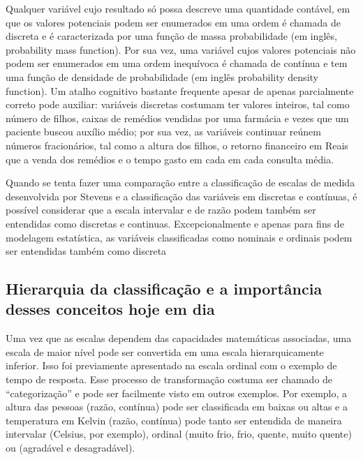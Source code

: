 \documentclass[
]{book}
\begin{document}
Qualquer variável cujo resultado só possa descreve uma quantidade contável, em que os valores potenciais podem ser enumerados em uma ordem é chamada de discreta e é caracterizada por uma função de massa probabilidade (em inglês, probability mass function). Por sua vez, uma variável cujos valores potenciais não podem ser enumerados em uma ordem inequívoca é chamada de contínua e tem uma função de densidade de probabilidade (em inglês probability density function). Um atalho cognitivo bastante frequente apesar de apenas parcialmente correto pode auxiliar: variáveis discretas costumam ter valores inteiros, tal como número de filhos, caixas de remédios vendidas por uma farmácia e vezes que um paciente buscou auxílio médio; por sua vez, as variáveis continuar reúnem números fracionários, tal como a altura dos filhos, o retorno financeiro em Reais que a venda dos remédios e o tempo gasto em cada em cada consulta média.

Quando se tenta fazer uma comparação entre a classificação de escalas de medida desenvolvida por Stevens e a classificação das variáveis em discretas e contínuas, é possível considerar que a escala intervalar e de razão podem também ser entendidas como discretas e continuas. Excepcionalmente e apenas para fins de modelagem estatística, as variáveis classificadas como nominais e ordinais podem ser entendidas também como discreta \citep[p.20]{Borgatta1980, privitera2016}

\hypertarget{hierarquia-da-classificauxe7uxe3o-e-a-importuxe2ncia-desses-conceitos-hoje-em-dia}{%
\subsection{Hierarquia da classificação e a importância desses conceitos hoje em dia}\label{hierarquia-da-classificauxe7uxe3o-e-a-importuxe2ncia-desses-conceitos-hoje-em-dia}}

Uma vez que as escalas dependem das capacidades matemáticas associadas, uma escala de maior nível pode ser convertida em uma escala hierarquicamente inferior. Isso foi previamente apresentado na escala ordinal com o exemplo de tempo de resposta. Esse processo de transformação costuma ser chamado de ``categorização'' e pode ser facilmente visto em outros exemplos. Por exemplo, a altura das pessoas (razão, contínua) pode ser classificada em baixas ou altas e a temperatura em Kelvin (razão, contínua) pode tanto ser entendida de maneira intervalar (Celsius, por exemplo), ordinal (muito frio, frio, quente, muito quente) ou (agradável e desagradável).
\end{document}
